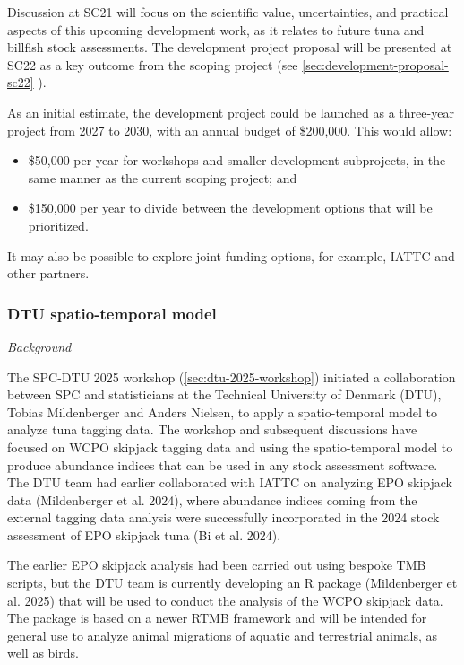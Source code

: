 \documentclass{SCreport}
\begin{document}
Discussion at SC21 will focus on the scientific value, uncertainties, and
practical aspects of this upcoming development work, as it relates to future
tuna and billfish stock assessments. The development project proposal will be
presented at SC22 as a key outcome from the scoping project
(see \autoref{sec:development-proposal-sc22} ).

As an initial estimate, the development project could be launched as a
three-year project from 2027 to 2030, with an annual budget of \$200,000. This
would allow:

\begin{itemize}
  \item \$50,000 per year for workshops and smaller development subprojects, in
  the same manner as the current scoping project; and
  \item \$150,000 per year to divide between the development options that will
  be prioritized.
\end{itemize}

\vspace{2ex}

It may also be possible to explore joint funding options, for example, IATTC and
other partners.

\vspace{2ex}

\subsubsection{DTU spatio-temporal model}
\label{sec:dtu-development-project}

\vspace{1ex}

\textit{Background}

The SPC-DTU 2025 workshop (\autoref{sec:dtu-2025-workshop}) initiated a
collaboration between SPC and statisticians at the Technical University of
Denmark (DTU), Tobias Mildenberger and Anders Nielsen, to apply a
spatio-temporal model to analyze tuna tagging data. The workshop and subsequent
discussions have focused on WCPO skipjack tagging data and using the
spatio-temporal model to produce abundance indices that can be used in any stock
assessment software. The DTU team had earlier collaborated with IATTC on
analyzing EPO skipjack data (Mildenberger et al. 2024), where abundance indices
coming from the external tagging data analysis were successfully incorporated in
the 2024 stock assessment of EPO skipjack tuna (Bi et al. 2024).

The earlier EPO skipjack analysis had been carried out using bespoke TMB
scripts, but the DTU team is currently developing an R package (Mildenberger et
al. 2025) that will be used to conduct the analysis of the WCPO skipjack data.
The package is based on a newer RTMB framework and will be intended for general
use to analyze animal migrations of aquatic and terrestrial animals, as well as
birds.
\end{document}
